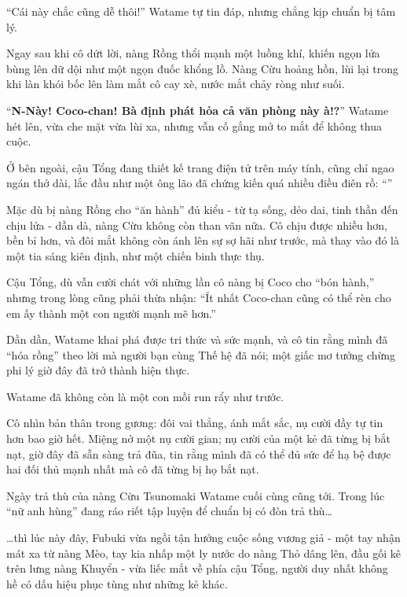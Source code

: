 \documentclass[../main.tex]{subfiles}
\begin{document}
``Cái này chắc cũng dễ thôi!'' Watame tự tin đáp, nhưng chẳng kịp chuẩn bị tâm lý.

Ngay sau khi cô dứt lời, nàng Rồng thổi mạnh một luồng khí, khiến ngọn lửa bùng lên dữ dội như một ngọn đuốc khổng lồ. Nàng Cừu hoảng hồn, lùi lại trong khi làn khói bốc lên làm mắt cô cay xè, nước mắt chảy ròng như suối.

``\textbf{N-Này! Coco-chan! Bà định phát hỏa cả văn phòng này à!?}'' Watame hét lên, vừa che mặt vừa lùi xa, nhưng vẫn cố gắng mở to mắt để không thua cuộc.

Ở bên ngoài, cậu Tổng đang thiết kế trang điện tử trên máy tính, cũng chỉ ngao ngán thở dài, lắc đầu như một ông lão đã chứng kiến quá nhiều điều điên rồ: ``''

\ct

Mặc dù bị nàng Rồng cho ``ăn hành'' đủ kiểu - từ tạ sống, dẻo dai, tinh thần đến chịu lửa - dần dà, nàng Cừu không còn than vãn nữa. Cô chịu được nhiều hơn, bền bỉ hơn, và đôi mắt không còn ánh lên sự sợ hãi như trước, mà thay vào đó là một tia sáng kiên định, như một chiến binh thực thụ.

Cậu Tổng, dù vẫn cười chát với những lần cô nàng bị Coco cho ``bón hành,'' nhưng trong lòng cũng phải thừa nhận: ``Ít nhất Coco-chan cũng có thể rèn cho em ấy thành một con người mạnh mẽ hơn.''

Dần dần, Watame khai phá được tri thức và sức mạnh, và cô tin rằng mình đã ``hóa rồng'' theo lời mà người bạn cùng Thế hệ đã nói; một giấc mơ tưởng chừng phi lý giờ đây đã trở thành hiện thực.

Watame đã không còn là một con mồi run rẩy như trước.

Cô nhìn bản thân trong gương: đôi vai thẳng, ánh mắt sắc, nụ cười đầy tự tin hơn bao giờ hết. Miệng nở một nụ cười gian; nụ cười của một kẻ đã từng bị bắt nạt, giờ đây đã sẵn sàng trả đũa, tin rằng mình đã có thể đủ sức để hạ bệ được hai đối thủ mạnh nhất mà cô đã từng bị họ bắt nạt.

\ct

Ngày trả thù của nàng Cừu Tsunomaki Watame cuối cùng cũng tới. Trong lúc ``nữ anh hùng'' đang ráo riết tập luyện để chuẩn bị có đòn trả thù\dots

\dots thì lúc này đây, Fubuki vừa ngồi tận hưởng cuộc sống vương giả - một tay nhận mát xa từ nàng Mèo, tay kia nhấp một ly nước do nàng Thỏ dâng lên, đầu gối kê trên lưng nàng Khuyển - vừa liếc mắt về phía cậu Tổng, người duy nhất không hề có dấu hiệu phục tùng như những kẻ khác.
\end{document}
